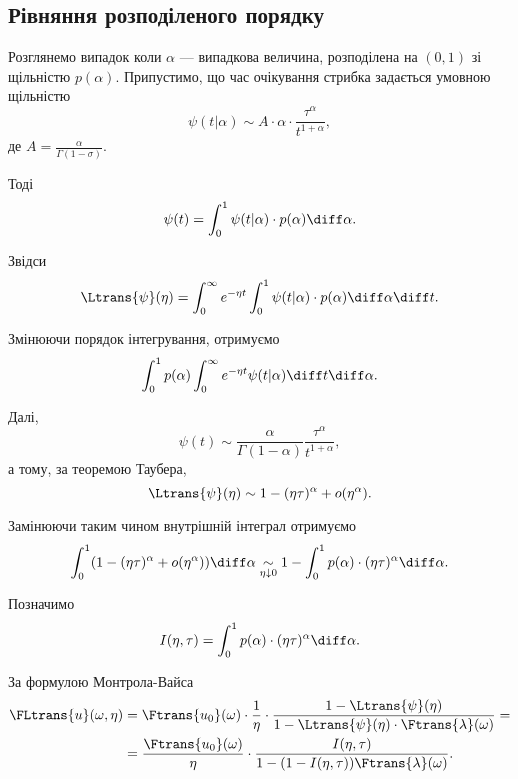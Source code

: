 \subsection{Рівняння розподіленого порядку}

Розглянемо випадок коли $\alpha$ --- випадкова величина, розподілена на $(0, 1)$ зі щільністю $p(\alpha)$. Припустимо, що час очікування стрибка задається умовною щільністю
\begin{equation}
    \psi(t|\alpha) \sim A \cdot \alpha \cdot \frac{\tau^\alpha}{t^{1 + \alpha}},
\end{equation}
де $A = \frac{\alpha}{\Gamma (1 - \sigma)}$. \medskip

Тоді
\begin{equation}
    \psi(t) = \int_0^1 \psi(t|\alpha) \cdot p(\alpha) \diff \alpha.
\end{equation}

Звідси
\begin{equation}
    \Ltrans{\psi}(\eta)
    = \int_0^\infty e^{-\eta t} \int_0^1 \psi(t|\alpha) \cdot p(\alpha) \diff \alpha \diff t.
\end{equation}

Змінюючи порядок інтегрування, отримуємо
\begin{equation}
    \int_0^1 p(\alpha) \int_0^\infty e^{-\eta t} \psi(t|\alpha) \diff t \diff \alpha.
\end{equation}

Далі,
\begin{equation}
    \psi(t) \sim \frac{\alpha}{\Gamma(1 - \alpha)} \frac{\tau^\alpha}{t^{1 + \alpha}},
\end{equation}
а тому, за теоремою Таубера,
\begin{equation}
    \Ltrans{\psi}(\eta) \sim 1 - (\eta \tau)^\alpha + o(\eta^\alpha).
\end{equation}

Замінюючи таким чином внутрішній інтеграл отримуємо
\begin{equation}
    \int_0^1 ( 1 - (\eta \tau)^\alpha + o(\eta^\alpha) ) \diff \alpha
    \underset{\eta \downarrow 0}{\sim} 1 - \int_0^1 p(\alpha) \cdot (\eta \tau)^\alpha \diff \alpha.
\end{equation}

Позначимо
\begin{equation}
    I(\eta, \tau) = \int_0^1 p(\alpha) \cdot (\eta \tau)^\alpha \diff \alpha.
\end{equation}

За формулою Монтрола-Вайса
\begin{equation}
    \begin{aligned}
        \FLtrans{u}(\omega, \eta)
        &= \Ftrans{u_0}(\omega) \cdot \frac{1}{\eta} \cdot \frac{1 - \Ltrans{\psi}(\eta)}{1 - \Ltrans{\psi}(\eta) \cdot \Ftrans{\lambda}(\omega)} = \\
        &= \frac{\Ftrans{u_0}(\omega)}{\eta} \cdot \frac{I(\eta, \tau)}{1 - (1 - I(\eta, \tau)) \Ftrans{\lambda}(\omega)}.
    \end{aligned}
\end{equation}


